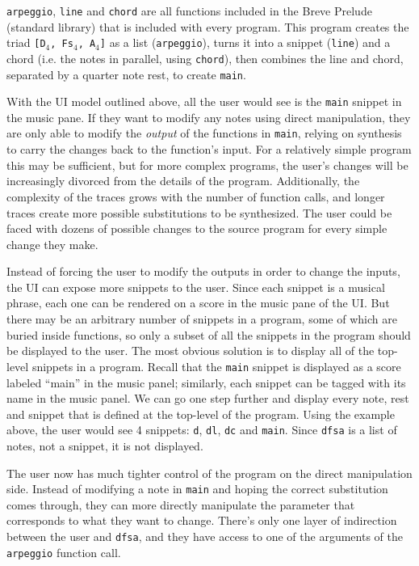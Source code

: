 \documentclass[nocopyrightspace,numbers,10pt]{sigplanconf}
\begin{document}
\texttt{arpeggio}, \texttt{line} and \texttt{chord} are all functions included
in the Breve Prelude (standard library) that is included with every program.
This program creates the triad \texttt{[D$_4$, Fs$_4$, A$_4$]} as a list
(\texttt{arpeggio}), turns it into a snippet (\texttt{line}) and a chord (i.e.
the notes in parallel, using \texttt{chord}), then combines the line and chord,
separated by a quarter note rest, to create \texttt{main}.

With the UI model outlined above, all the user would see is the \texttt{main}
snippet in the music pane. If they want to modify any notes using direct
manipulation, they are only able to modify the \emph{output} of the functions in
\texttt{main}, relying on synthesis to carry the changes back to the function's
input. For a relatively simple program this may be sufficient, but for more
complex programs, the user's changes will be increasingly divorced from the
details of the program.  Additionally, the complexity of the traces grows with
the number of function calls, and longer traces create more possible
substitutions to be synthesized.  The user could be faced with dozens of
possible changes to the source program for every simple change they make.

Instead of forcing the user to modify the outputs in order to change the inputs,
the UI can expose more snippets to the user. Since each snippet is a musical
phrase, each one can be rendered on a score in the music pane of the UI. But
there may be an arbitrary number of snippets in a program, some of which are
buried inside functions, so only a subset of all the snippets in the program
should be displayed to the user. The most obvious solution is to display all of
the top-level snippets in a program. Recall that the \texttt{main} snippet is
displayed as a score labeled ``main'' in the music panel; similarly, each
snippet can be tagged with its name in the music panel. We can go one step
further and display every note, rest and snippet that is defined at the
top-level of the program. Using the example above, the user would see 4
snippets: \texttt{d}, \texttt{dl}, \texttt{dc} and \texttt{main}. Since
\texttt{dfsa} is a list of notes, not a snippet, it is not displayed.

The user now has much tighter control of the program on the direct manipulation
side. Instead of modifying a note in \texttt{main} and hoping the correct
substitution comes through, they can more directly manipulate the parameter that
corresponds to what they want to change. There's only one layer of indirection
between the user and \texttt{dfsa}, and they have access to one of the
arguments of the \texttt{arpeggio} function call.
\end{document}
